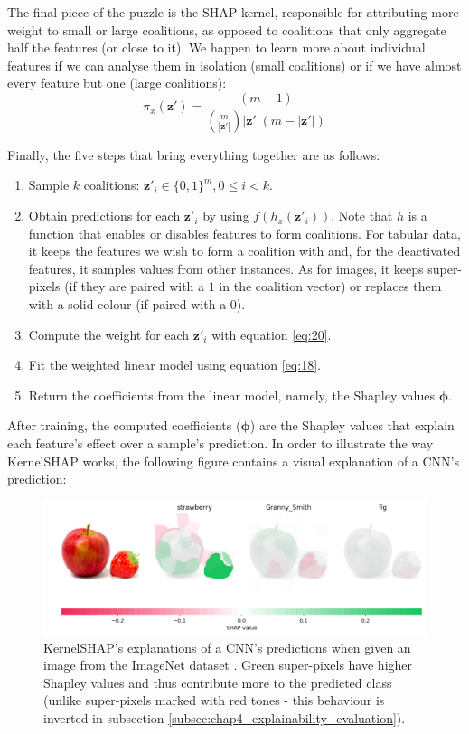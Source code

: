 The final piece of the puzzle is the \ac{SHAP} kernel, responsible for attributing more weight to small or large coalitions, as opposed to coalitions that only aggregate half the features (or close to it). We happen to learn more about individual features if we can analyse them in isolation (small coalitions) or if we have almost every feature but one (large  coalitions):
\begin{equation}
    \pi_{x}(\mathbf{z}') = \frac{(m - 1)}{\binom{m}{|\mathbf{z}'|}|\mathbf{z}'|(m - |\mathbf{z}'|)}
    \label{eq:20}
\end{equation}

Finally, the five steps that bring everything together are as follows:

\begin{enumerate}
    \item Sample $k$ coalitions: $\mathbf{z}'_{i} \in \{0,1\}^m, 0 \leq i < k$.
    \item Obtain predictions for each $\mathbf{z}'_{i}$ by using $f(h_x(\mathbf{z}'_{i}))$. Note that $h$ is a function that enables or disables features to form coalitions. For tabular data, it keeps the features we wish to form a coalition with and, for the deactivated features, it samples values from other instances. As for images, it keeps super-pixels (if they are paired with a $1$ in the coalition vector) or replaces them with a solid colour (if paired with a $0$).
    \item Compute the weight for each $\mathbf{z}'_{i}$ with equation \ref{eq:20}.
    \item Fit the weighted linear model using equation \ref{eq:18}.
    \item Return the coefficients from the linear model, namely, the Shapley values $\boldsymbol{\phi}$.
\end{enumerate}

After training, the computed coefficients ($\boldsymbol{\phi}$) are the Shapley values that explain each feature's effect over a sample's prediction. In order to illustrate the way Kernel\ac{SHAP} works, the following figure contains a visual explanation of a \ac{CNN}'s prediction:

\begin{figure}[h]
\centering
\includegraphics[width=380pt]{figures/figure_25.pdf}
\caption{Kernel\ac{SHAP}'s explanations of a \ac{CNN}'s predictions when given an image from the ImageNet dataset \cite{shap}. Green super-pixels have higher Shapley values and thus contribute more to the predicted class (unlike super-pixels marked with red tones - this behaviour is inverted in subsection \ref{subsec:chap4_explainability_evaluation}).}
\label{fig:shap}
\end{figure}

